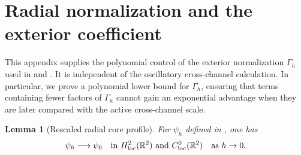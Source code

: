 \documentclass[11pt]{article}
\newtheorem{lemma}[theorem]{Lemma}
\newcommand{\R}{\mathbb R}
\begin{document}
\section{Radial normalization and the exterior coefficient}\label{app:radial-normalization}
This appendix supplies the polynomial control of the exterior normalization
$\Gamma_h$ used in  and
.  It is independent of the oscillatory
cross-channel calculation.  In particular, we prove a polynomial lower bound
for $\Gamma_h$, ensuring that terms containing fewer factors of $\Gamma_h$
cannot gain an exponential advantage when they are later compared with the
active cross-channel scale.

\begin{lemma}[Rescaled radial core profile]\label{lem:radial-core-profile}
For $\psi_h$ defined in , one has
\begin{equation}\label{eq:core-profile-convergence}
 \psi_h\longrightarrow\psi_0
 \quad\hbox{in }H^2_{\rm loc}(\R^2)\hbox{ and }C^0_{\rm loc}(\R^2)
 \quad\hbox{as }h\to0.
\end{equation}
\end{lemma}
\end{document}
